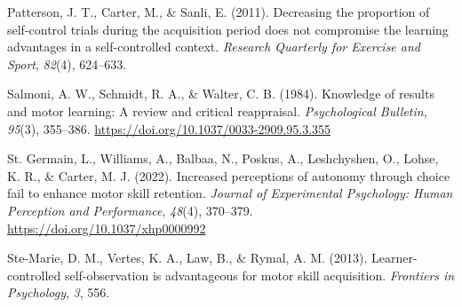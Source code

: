 \documentclass[final]{article}
\newlength{\cslhangindent}
\newenvironment{CSLReferences}[2] %
 {%
  \setlength{\parindent}{0pt}
  \ifodd #1 \everypar{\setlength{\hangindent}{\cslhangindent}}\ignorespaces\fi
  \ifnum #2 > 0
  \setlength{\parskip}{#2\baselineskip}
  \fi
 }%
 {}
\begin{document}
\begin{CSLReferences}{1}{0}
\leavevmode{}%
Patterson, J. T., Carter, M., \& Sanli, E. (2011). Decreasing the proportion of self-control trials during the acquisition period does not compromise the learning advantages in a self-controlled context. \emph{Research Quarterly for Exercise and Sport}, \emph{82}(4), 624--633.

\leavevmode{}%
Salmoni, A. W., Schmidt, R. A., \& Walter, C. B. (1984). Knowledge of results and motor learning: A review and critical reappraisal. \emph{Psychological Bulletin}, \emph{95}(3), 355--386. \url{https://doi.org/10.1037/0033-2909.95.3.355}

\leavevmode{}%
St. Germain, L., Williams, A., Balbaa, N., Poskus, A., Leshchyshen, O., Lohse, K. R., \& Carter, M. J. (2022). Increased perceptions of autonomy through choice fail to enhance motor skill retention. \emph{Journal of Experimental Psychology: Human Perception and Performance}, \emph{48}(4), 370--379. \url{https://doi.org/10.1037/xhp0000992}

\leavevmode{}%
Ste-Marie, D. M., Vertes, K. A., Law, B., \& Rymal, A. M. (2013). Learner-controlled self-observation is advantageous for motor skill acquisition. \emph{Frontiers in Psychology}, \emph{3}, 556.

\end{CSLReferences}
\end{document}
